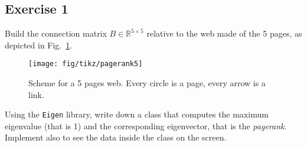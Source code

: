 \subsection*{Exercise 1}

Build the connection matrix $B\in \mathbb{R}^{5 \times 5}$ relative to the web
made of the 5 pages, as depicted in Fig.~\ref{fig:web}.
%
\begin{figure}
\centering
\texttt{[image: fig/tikz/pagerank5]}
\caption{Scheme for a 5 pages web. Every circle is a page, every arrow is a
link.}
\label{fig:web}
\end{figure}
%
Using the \texttt{Eigen} library, write down a class that computes the maximum
eigenvalue (that is 1) and the corresponding eigenvector, that is the
\emph{pagerank}. Implement also  to see the data inside the
class on the screen.
